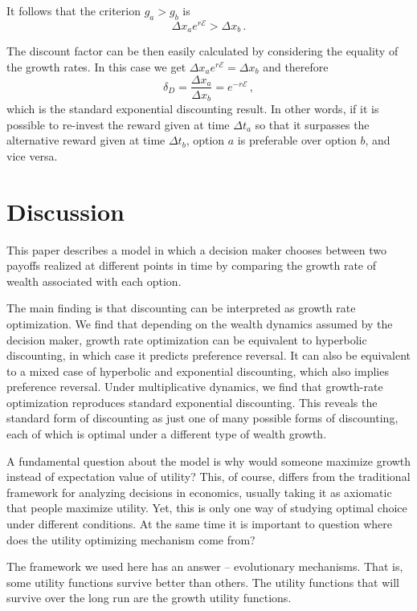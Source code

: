 \documentclass[11pt]{article}
\newcommand{\be}{\begin{equation}}
\newcommand{\ee}{\end{equation}}
\newcommand{\Dt}{\Delta t}
\newcommand{\Dx}{\Delta x}
\newcommand{\Epsilon}{\mathcal{E}}
\numberwithin{equation}{section}
\begin{document}
It follows that the criterion $g_a > g_b$ is
\be
\Dx_a e^{r \Epsilon} > \Dx_b\,.
\ee

The discount factor can be then easily calculated by considering the equality of the growth rates. In this case we get $\Dx_a e^{r \Epsilon} = \Dx_b$ and therefore
\be
\delta_D = \frac{\Dx_a}{\Dx_b} = e^{-r\Epsilon}\,,
\ee
which is the standard exponential discounting result. In other words, if it is possible to re-invest the reward given at time $\Dt_a$ so that it surpasses the alternative reward given at time $\Dt_b$, option $a$ is preferable over option $b$, and vice versa.

\section{Discussion}\label{sec:discussion}

This paper describes a model in which a decision maker chooses between two payoffs realized at different points in time by comparing the growth rate of wealth associated with each option.

The main finding is that discounting can be interpreted as growth rate optimization. We find that depending on the wealth dynamics assumed by the decision maker, growth rate optimization can be equivalent to hyperbolic discounting, in which case it predicts preference reversal. It can also be equivalent to a mixed case of hyperbolic and exponential discounting, which also implies preference reversal. Under multiplicative dynamics, we find that growth-rate optimization reproduces standard exponential discounting. This reveals the standard form of discounting as just one of many possible forms of discounting, each of which is optimal under a different type of wealth growth.

A fundamental question about the model is why would someone maximize growth instead of expectation value of utility? This, of course, differs from the traditional framework for analyzing decisions in economics, usually taking it as axiomatic that people maximize utility. Yet, this is only one way of studying optimal choice under different conditions. At the same time it is important to question where does the utility optimizing mechanism come from?

The framework we used here has an answer -- evolutionary mechanisms. That is, some utility functions survive better than others. The utility functions that will survive over the long run are the growth utility functions.
\end{document}
